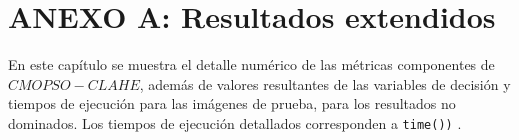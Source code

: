 \chapter*{ANEXO A: Resultados extendidos}
\label{ch:anexo}

En este capítulo se muestra el detalle numérico de las métricas componentes de $CMOPSO-CLAHE$, además de valores resultantes de las variables de decisión y tiempos de ejecución para las imágenes de prueba, para los resultados no dominados. Los tiempos de ejecución detallados corresponden a \texttt{time())} \cite{time}.


